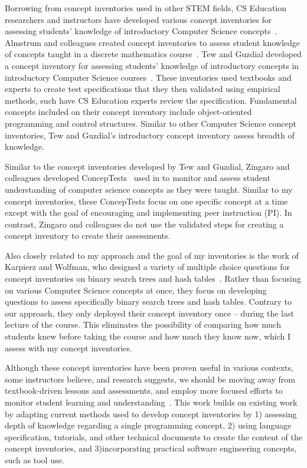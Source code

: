 Borrowing from concept inventories used in other STEM fields, CS Education researchers and instructors have developed various concept inventories for assessing students' knowledge of introductory Computer Science concepts~\cite{almstrum2006concept, krone2010reasoning,tew2010assessing}. Almstrum and colleagues created concept inventories to assess student knowledge of concepts taught in a discrete mathematics course~\cite{almstrum2006concept}. 
Tew and Guzdial developed a concept inventory for assessing students' knowledge of introductory concepts in introductory Computer Science courses~\cite{tew2010assessing, tew2010developing}. These inventories used textbooks and experts to create test specifications that they then validated using empirical methods, such have CS Education experts review the specification. Fundamental concepts included on their concept inventory include object-oriented programming and control structures. Similar to other Computer Science concept inventories, Tew and Guzdial's introductory concept inventory assess breadth of knowledge. 
	
Similar to the concept inventories developed by Tew and Guzdial, Zingaro and colleagues developed ConcepTests~\cite{zingaro2010experience} used in to monitor and assess student understanding of computer science concepts as they were taught. Similar to my concept inventories, these ConcepTests focus on one specific concept at a time except with the goal of encouraging and implementing peer instruction (PI). In contrast, Zingaro and colleagues do not use the validated steps for creating a concept inventory to create their assessments.
	
Also closely related to my approach and the goal of my inventories is the work of Karpierz and Wolfman, who designed a variety of multiple choice questions for concept inventories on binary search trees and hash tables~\cite{Karpierz2014Misconception}. Rather than focusing on various Computer Science concepts at once, they focus on developing questions to assess specifically binary search trees and hash tables. Contrary to our approach, they only deployed their concept inventory once -- during the last lecture of the course. This eliminates the possibility of comparing how much students knew before taking the course and how much they know now, which I assess with my concept inventories.
	
Although these concept inventories have been proven useful in various contexts, some instructors believe, and research suggests, we should be moving away from textbook-driven lessons and assessments, and employ more focused efforts to monitor student learning and understanding~\cite{pellegrino2001knowing, ghezzi2005challenges, wohlin1999achieving}. This work builds on existing work by adapting current methods used to develop concept inventories by 1) assessing depth of knowledge regarding a single programming concept, 2) using language specification, tutorials, and other technical documents to create the content of the concept inventories, and 3)incorporating practical software engineering concepts, such as tool use.

